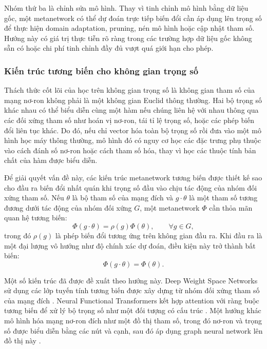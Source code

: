Nhóm thứ ba là chỉnh sửa mô hình. Thay vì tinh chỉnh mô hình bằng dữ liệu gốc, một metanetwork có thể dự đoán trực tiếp biến đổi cần áp dụng lên trọng số để thực hiện domain adaptation, pruning, nén mô hình hoặc cập nhật tham số. Hướng này có giá trị thực tiễn rõ ràng trong các trường hợp dữ liệu gốc không sẵn có hoặc chi phí tinh chỉnh đầy đủ vượt quá giới hạn cho phép.

\subsubsection{Kiến trúc tương biến cho không gian trọng số}

Thách thức cốt lõi của học trên không gian trọng số là không gian tham số của mạng nơ-ron không phải là một không gian Euclid thông thường. Hai bộ trọng số khác nhau có thể biểu diễn cùng một hàm nếu chúng liên hệ với nhau thông qua các đối xứng tham số như hoán vị nơ-ron, tái tỉ lệ trọng số, hoặc các phép biến đổi liên tục khác. Do đó, nếu chỉ vector hóa toàn bộ trọng số rồi đưa vào một mô hình học máy thông thường, mô hình đó có nguy cơ học các đặc trưng phụ thuộc vào cách đánh số nơ-ron hoặc cách tham số hóa, thay vì học các thuộc tính bản chất của hàm được biểu diễn.

Để giải quyết vấn đề này, các kiến trúc metanetwork tương biến được thiết kế sao cho đầu ra biến đổi nhất quán khi trọng số đầu vào chịu tác động của nhóm đối xứng tham số. Nếu $\theta$ là bộ tham số của mạng đích và $g \cdot \theta$ là một tham số tương đương dưới tác động của nhóm đối xứng $G$, một metanetwork $\Phi$ cần thỏa mãn quan hệ tương biến:
\begin{equation}
    \Phi(g \cdot \theta)
    =
    \rho(g)\Phi(\theta),
    \qquad \forall g \in G,
    \label{eq:weight-space-equivariance}
\end{equation}
trong đó $\rho(g)$ là phép biến đổi tương ứng trên không gian đầu ra. Khi đầu ra là một đại lượng vô hướng như độ chính xác dự đoán, điều kiện này trở thành bất biến:
\begin{equation}
    \Phi(g \cdot \theta)
    =
    \Phi(\theta).
    \label{eq:weight-space-invariance}
\end{equation}

Một số kiến trúc đã được đề xuất theo hướng này. Deep Weight Space Networks sử dụng các lớp tuyến tính tương biến được xây dựng từ nhóm đối xứng tham số của mạng đích \cite{navon2023equivariant}. Neural Functional Transformers kết hợp attention với ràng buộc tương biến để xử lý bộ trọng số như một đối tượng có cấu trúc \cite{zhou2024neural}. Một hướng khác mô hình hóa mạng nơ-ron đích như một đồ thị tham số, trong đó nơ-ron và trọng số được biểu diễn bằng các nút và cạnh, sau đó áp dụng graph neural network lên đồ thị này \cite{lim2023graph}.

